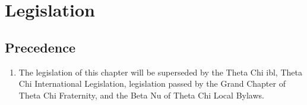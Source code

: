\chapter{Legislation}

	\section{Precedence}
		\begin{enumerate}
			\item The legislation of this chapter will be superseded by the Theta Chi \gls{ibl}, Theta Chi International Legislation, legislation passed by the Grand Chapter of Theta Chi Fraternity, and the Beta Nu of Theta Chi Local Bylaws.

		\end{enumerate}

